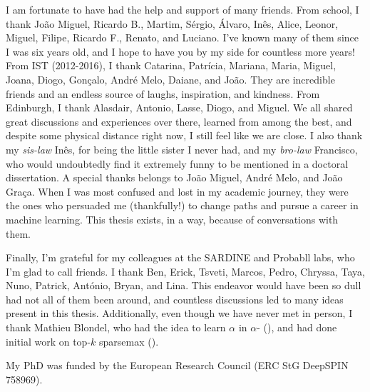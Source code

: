 \begin{acknowledgments}
    I am fortunate to have had the help and support of many friends.
    From school, I thank João Miguel, Ricardo B., Martim, Sérgio,
    Álvaro, Inês, Alice, Leonor, Miguel, Filipe, Ricardo F., Renato,
    and Luciano. I've known many of them since I was six years old,
    and I hope to have you by my side for countless more years! From
    IST (2012-2016), I thank Catarina, Patrícia, Mariana, Maria,
    Miguel, Joana, Diogo, Gonçalo, André Melo, Daiane, and João. They
    are incredible friends and an endless source of laughs,
    inspiration, and kindness. From Edinburgh, I thank Alasdair,
    Antonio, Lasse, Diogo, and Miguel. We all shared great
    discussions and experiences over there, learned from among the
    best, and despite some physical distance right now, I still feel
    like we are close. I also thank my \textit{sis-law} Inês, for
    being the little sister I never had, and my \textit{bro-law}
    Francisco, who would undoubtedly find it extremely funny to be
    mentioned in a doctoral dissertation. A special thanks belongs to
    João Miguel, André Melo, and João Graça. When I was most confused
    and lost in my academic journey, they were the ones who persuaded
    me (thankfully!) to change paths and pursue a career in machine
    learning. This thesis exists, in a way, because of conversations
    with them.
    
    Finally, I'm grateful for my colleagues at the SARDINE and
    Probabll labs, who I'm glad to call friends. I thank Ben, Erick,
    Tsveti, Marcos, Pedro, Chryssa, Taya, Nuno, Patrick, António,
    Bryan, and Lina. This endeavor would have been so dull had not
    all of them been around, and countless discussions led to many
    ideas present in this thesis. Additionally, even though we have
    never met in person, I thank Mathieu Blondel, who had the idea to
    learn $\alpha$ in $\alpha$-\entmaxtext
    (), and had done initial work on
    top-$k$ sparsemax ().
    
    My PhD was funded by the European Research Council (ERC
    StG DeepSPIN 758969).
    
\end{acknowledgments}
\clearpage
\thispagestyle{empty}
\cleardoublepage
